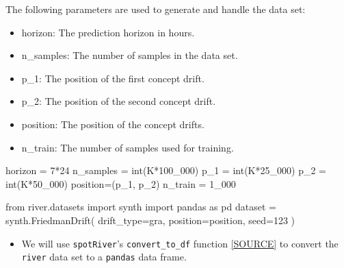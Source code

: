 \documentclass[
  letterpaper,
  DIV=11,
  numbers=noendperiod]{scrreprt}
\newenvironment{Shaded}{\begin{snugshade}}{\end{snugshade}}
\newcommand{\BuiltInTok}[1]{\textcolor[rgb]{0.00,0.23,0.31}{#1}}
\newcommand{\DecValTok}[1]{\textcolor[rgb]{0.68,0.00,0.00}{#1}}
\newcommand{\ImportTok}[1]{\textcolor[rgb]{0.00,0.46,0.62}{#1}}
\newcommand{\NormalTok}[1]{\textcolor[rgb]{0.00,0.23,0.31}{#1}}
\newcommand{\OperatorTok}[1]{\textcolor[rgb]{0.37,0.37,0.37}{#1}}
\newcommand{\StringTok}[1]{\textcolor[rgb]{0.13,0.47,0.30}{#1}}
\providecommand{\tightlist}{%
  \setlength{\itemsep}{0pt}\setlength{\parskip}{0pt}}\usepackage{longtable,booktabs,array}
\begin{document}
The following parameters are used to generate and handle the data set:

\begin{itemize}
\tightlist
\item
  horizon: The prediction horizon in hours.
\item
  n\_samples: The number of samples in the data set.
\item
  p\_1: The position of the first concept drift.
\item
  p\_2: The position of the second concept drift.
\item
  position: The position of the concept drifts.
\item
  n\_train: The number of samples used for training.
\end{itemize}

\begin{Shaded}
\begin{Highlighting}[]
\NormalTok{horizon }\OperatorTok{=} \DecValTok{7}\OperatorTok{*}\DecValTok{24}
\NormalTok{n\_samples }\OperatorTok{=} \BuiltInTok{int}\NormalTok{(K}\OperatorTok{*}\DecValTok{100\_000}\NormalTok{)}
\NormalTok{p\_1 }\OperatorTok{=} \BuiltInTok{int}\NormalTok{(K}\OperatorTok{*}\DecValTok{25\_000}\NormalTok{)}
\NormalTok{p\_2 }\OperatorTok{=} \BuiltInTok{int}\NormalTok{(K}\OperatorTok{*}\DecValTok{50\_000}\NormalTok{)}
\NormalTok{position}\OperatorTok{=}\NormalTok{(p\_1, p\_2)}
\NormalTok{n\_train }\OperatorTok{=} \DecValTok{1\_000}
\end{Highlighting}
\end{Shaded}

\begin{Shaded}
\begin{Highlighting}[]
\ImportTok{from}\NormalTok{ river.datasets }\ImportTok{import}\NormalTok{ synth}
\ImportTok{import}\NormalTok{ pandas }\ImportTok{as}\NormalTok{ pd}
\NormalTok{dataset }\OperatorTok{=}\NormalTok{ synth.FriedmanDrift(}
\NormalTok{   drift\_type}\OperatorTok{=}\StringTok{\textquotesingle{}gra\textquotesingle{}}\NormalTok{,}
\NormalTok{   position}\OperatorTok{=}\NormalTok{position,}
\NormalTok{   seed}\OperatorTok{=}\DecValTok{123}
\NormalTok{)}
\end{Highlighting}
\end{Shaded}

\begin{itemize}
\tightlist
\item
  We will use \texttt{spotRiver}'s \texttt{convert\_to\_df} function
  \href{https://github.com/sequential-parameter-optimization/spotRiver/blob/main/src/spotRiver/utils/data_conversion.py}{{[}SOURCE{]}}
  to convert the \texttt{river} data set to a \texttt{pandas} data
  frame.
\end{itemize}
\end{document}
